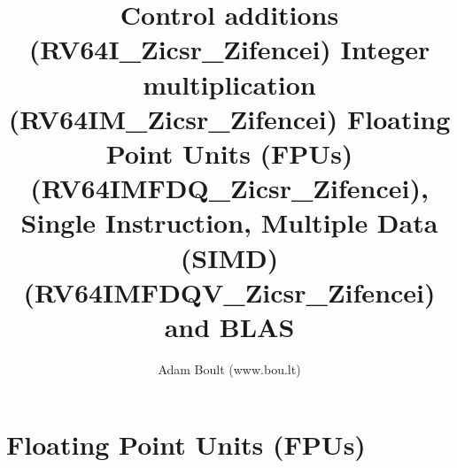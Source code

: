 \documentclass[oneside]{book}
\begin{document}
\author{Adam Boult (www.bou.lt)}
\title{Control additions (RV64I\_Zicsr\_Zifencei) Integer multiplication (RV64IM\_Zicsr\_Zifencei) Floating Point Units (FPUs) (RV64IMFDQ\_Zicsr\_Zifencei), Single Instruction, Multiple Data (SIMD) (RV64IMFDQV\_Zicsr\_Zifencei) and BLAS}
\maketitle

\setcounter{tocdepth}{0}
\tableofcontents



\part{Floating Point Units (FPUs)}
\end{document}
